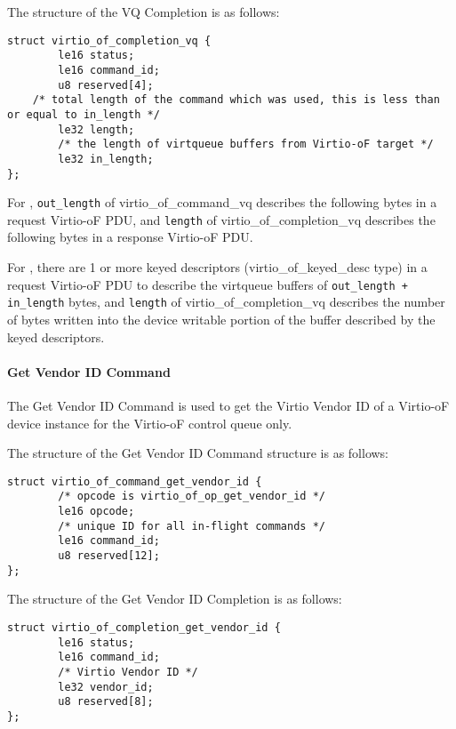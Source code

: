 The structure of the VQ Completion is as follows:
\begin{lstlisting}
struct virtio_of_completion_vq {
        le16 status;
        le16 command_id;
        u8 reserved[4];
	/* total length of the command which was used, this is less than or equal to in_length */
        le32 length;
        /* the length of virtqueue buffers from Virtio-oF target */
        le32 in_length;
};
\end{lstlisting}

For ,
\texttt{out_length} of virtio_of_command_vq describes the following bytes in a request Virtio-oF PDU,
and \texttt{length} of virtio_of_completion_vq describes the following bytes in a response Virtio-oF PDU.

For ,
there are 1 or more keyed descriptors (virtio_of_keyed_desc type) in a request Virtio-oF PDU to describe the virtqueue buffers of \texttt{out_length + in_length} bytes,
and \texttt{length} of virtio_of_completion_vq describes the number of bytes written into the device writable portion of the buffer described by the keyed descriptors.

\paragraph{Get Vendor ID Command}\label{sec:Virtio Transport Options / Virtio Over Fabrics / Commands Definition / Opcodes / Get Vendor ID Command}
The Get Vendor ID Command is used to get the Virtio Vendor ID of a Virtio-oF device instance for the Virtio-oF control queue only.

The structure of the Get Vendor ID Command structure is as follows:
\begin{lstlisting}
struct virtio_of_command_get_vendor_id {
        /* opcode is virtio_of_op_get_vendor_id */
        le16 opcode;
        /* unique ID for all in-flight commands */
        le16 command_id;
        u8 reserved[12];
};
\end{lstlisting}

The structure of the Get Vendor ID Completion is as follows:
\begin{lstlisting}
struct virtio_of_completion_get_vendor_id {
        le16 status;
        le16 command_id;
        /* Virtio Vendor ID */
        le32 vendor_id;
        u8 reserved[8];
};
\end{lstlisting}

